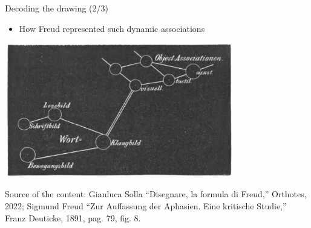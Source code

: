 \documentclass{beamer}
\begin{document}
\begin{frame}
{\centerline{Decoding the drawing (2/3)}}
 
\begin{itemize}
   \item How Freud represented such dynamic associations
 \end{itemize} 

\begin{center}
 \includegraphics[width=10cm]{P2023.AIBCCSS.Drawing/aphasien.jpg}
 
 \end{center}

\begin{center}
\tiny
Source of the content: Gianluca Solla ``Disegnare, la formula di Freud,'' Orthotes, 2022; Sigmund Freud ``Zur Auffassung der Aphasien. Eine kritische Studie,'' Franz Deuticke, 1891, pag. 79, fig. 8.
\end{center}
\end{frame}
\end{document}
